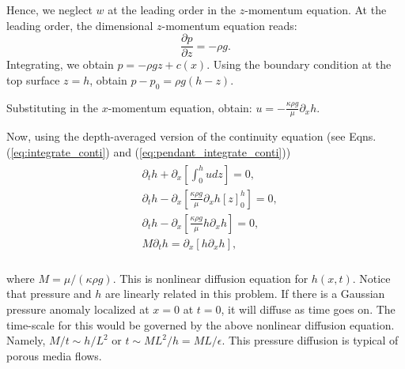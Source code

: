 \documentclass{article}
\begin{document}
%
Hence, we neglect $w$ at the leading order in the $z$-momentum equation. 
%
At the leading order, the dimensional $z$-momentum equation reads:
\begin{equation}
 \frac{\partial p}{\partial z} = -\rho g.
\end{equation}
Integrating, we obtain $p = -\rho g z + c(x)$. Using the boundary condition at the top surface $z=h$, obtain $ \boxed{ p - p_{0} = \rho g (h - z)}$.

Substituting in the $x$-momentum equation, obtain:
$\boxed{u = -\frac{\kappa \rho g}{\mu} \partial_{x}h}$.

Now, using the depth-averaged version of the continuity equation (see Eqns. (\ref{eq:integrate_conti}) and (\ref{eq:pendant_integrate_conti}))
\begin{align}
 \begin{split}
  & \partial_{t}h + \partial_{x}\left[ \int_{0}^{h} u dz\right] = 0,\\
  & \partial_{t}h - \partial_{x}\left[ \frac{\kappa \rho g}{\mu} \partial_{x}h [z]_{0}^{h} \right] = 0,\\
  & \partial_{t}h - \partial_{x}\left[ \frac{\kappa \rho g}{\mu} h \partial_{x}h \right] = 0,\\
  & M \partial_{t}h = \partial_{x}\left[ h \partial_{x}h \right],\\
 \end{split}
\end{align}

where $M = \mu/(\kappa \rho g)$. This is nonlinear diffusion equation for $h(x, t)$. Notice that pressure and $h$ are linearly related in this problem. If there is a Gaussian pressure anomaly localized at $x=0$ at $t=0$, it will diffuse as time goes on. The time-scale for this would be governed by the above nonlinear diffusion equation. Namely, $ M/ t \sim h/L^{2}$ or $t \sim ML^{2}/h = ML/\epsilon$. This pressure diffusion is typical of porous media flows. 


 \if@openright\cleardoublepage\else\clearpage\fi
 \cleardoublepage
 \pagestyle{empty}
\end{document}
